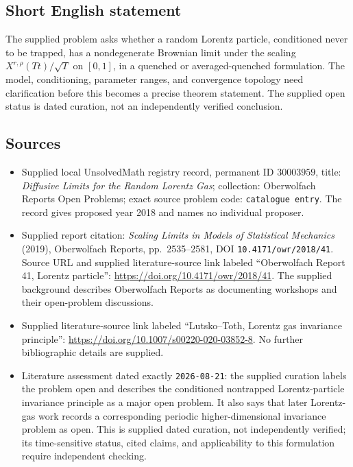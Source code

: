 \documentclass[11pt]{article}
\begin{document}
\subsection{Short English statement}
The supplied problem asks whether a random Lorentz particle, conditioned never to be trapped, has a nondegenerate Brownian limit under the scaling \(X^{r,\rho}(Tt)/\sqrt T\) on \([0,1]\), in a quenched or averaged-quenched formulation. The model, conditioning, parameter ranges, and convergence topology need clarification before this becomes a precise theorem statement. The supplied open status is dated curation, not an independently verified conclusion.
\subsection{Sources}
\begin{itemize}
\item Supplied local UnsolvedMath registry record, permanent ID \(30003959\), title: \emph{Diffusive Limits for the Random Lorentz Gas}; collection: Oberwolfach Reports Open Problems; exact source problem code: \texttt{catalogue entry}. The record gives proposed year 2018 and names no individual proposer.
\item Supplied report citation: \emph{Scaling Limits in Models of Statistical Mechanics} (2019), Oberwolfach Reports, pp.\ 2535--2581, DOI \texttt{10.4171/owr/2018/41}. Source URL and supplied literature-source link labeled ``Oberwolfach Report 41, Lorentz particle'': \url{https://doi.org/10.4171/owr/2018/41}. The supplied background describes Oberwolfach Reports as documenting workshops and their open-problem discussions.
\item Supplied literature-source link labeled ``Lutsko--Toth, Lorentz gas invariance principle'': \url{https://doi.org/10.1007/s00220-020-03852-8}. No further bibliographic details are supplied.
\item Literature assessment dated exactly \texttt{2026-08-21}: the supplied curation labels the problem open and describes the conditioned nontrapped Lorentz-particle invariance principle as a major open problem. It also says that later Lorentz-gas work records a corresponding periodic higher-dimensional invariance problem as open. This is supplied dated curation, not independently verified; its time-sensitive status, cited claims, and applicability to this formulation require independent checking.
\end{itemize}
\end{document}
